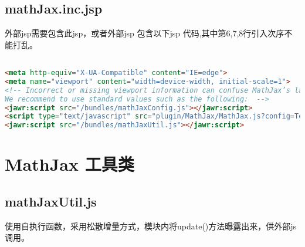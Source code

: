 \documentclass[UTF8]{ctexart}
\begin{document}
\subsection{mathJax.inc.jsp}
外部jsp需要包含此jsp，或者外部jsp 包含以下jsp 代码,其中第6,7,8行引入次序不能打乱。

\begin{lstlisting}[language=html]

<meta http-equiv="X-UA-Compatible" content="IE=edge">
<meta name="viewport" content="width=device-width, initial-scale=1">
<!-- Incorrect or missing viewport information can confuse MathJax’s layout process, leading to very small font sizes.
We recommend to use standard values such as the following:  -->
<jawr:script src="/bundles/mathJaxConfig.js"></jawr:script>
<script type="text/javascript" src="plugin/MathJax/MathJax.js?config=TeX-AMS_CHTML"></script>
<jawr:script src="/bundles/mathJaxUtil.js"></jawr:script>

\end{lstlisting}

\section{MathJax 工具类}

\subsection{mathJaxUtil.js}
使用自执行函数，采用松散增量方式，模块内将update()方法曝露出来，供外部js调用。
\end{document}
